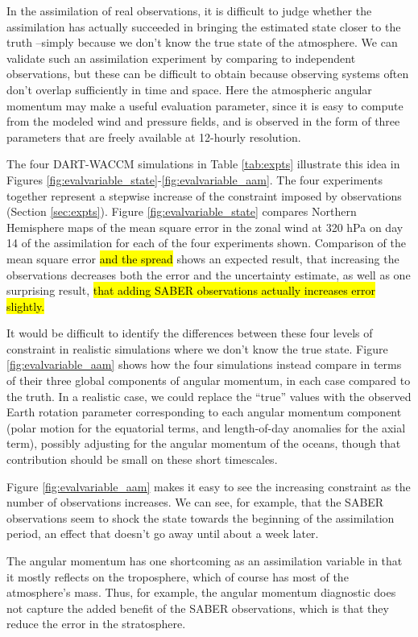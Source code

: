 In the assimilation of real observations, it is difficult to judge whether the assimilation has actually succeeded in bringing the estimated state closer to the truth --simply because we don't know the true state of the atmosphere.
We can validate such an assimilation experiment by comparing to independent observations, but these can be difficult to obtain because observing systems often don't overlap sufficiently in time and space.
Here the atmospheric angular momentum may make a useful evaluation parameter, since it is easy to compute from the modeled wind and pressure fields, and is observed in the form of three parameters that are freely available at 12-hourly resolution.  

The four DART-WACCM simulations in Table \ref{tab:expts} illustrate this idea in Figures \ref{fig:evalvariable_state}-\ref{fig:evalvariable_aam}. 
The four experiments together represent a stepwise increase of the constraint imposed by observations (Section \ref{sec:expts}).  
Figure \ref{fig:evalvariable_state} compares Northern Hemisphere maps of the mean square error in the zonal wind at 320 hPa on day 14 of the assimilation for each of the four experiments shown.
Comparison of the mean square error \hl{and the spread} shows an expected result, that increasing the observations decreases both the error and the uncertainty estimate, as well as one surprising result, \hl{that adding SABER observations actually increases error slightly.} 

It would be difficult to identify the differences between these four levels of constraint in realistic simulations where we don't know the true state. 
Figure \ref{fig:evalvariable_aam} shows how the four simulations instead compare in terms of their three global components of angular momentum, in each case compared to the truth.  
In a realistic case, we could replace the ``true'' values with the observed Earth rotation parameter corresponding to each angular momentum component (polar motion for the equatorial terms, and length-of-day anomalies for the axial term), possibly adjusting for the angular momentum of the oceans, though that contribution should be small on these short timescales.  

Figure  \ref{fig:evalvariable_aam} makes it easy to see the increasing constraint as the number of observations increases.
We can see, for example, that the SABER observations seem to shock the state towards the beginning of the assimilation period, an effect that doesn't go away until about a week later.  

The angular momentum has one shortcoming as an assimilation variable in that it mostly reflects on the troposphere, which of course has most of the atmosphere's mass.
Thus, for example, the angular momentum diagnostic does not capture the added benefit of the SABER observations, which is that they reduce the error in the stratosphere. 

